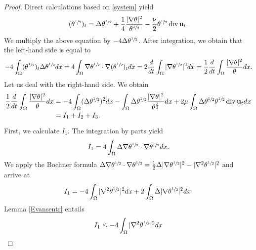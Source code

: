 \documentclass[11pt]{article}
\numberwithin{equation}{section}
\theoremstyle{plain}
\newcommand\bb[1]{\mathbf{#1}}
\newcommand{\io}{\int_{\Omega}}
\newcommand{\ul}{\frac{1}{2}}
\newcommand{\sul}{\sfrac{1}{2}}
\newcommand{\ddt}{\frac{d}{dt}}
\renewcommand{\div}{\operatorname{div}}
\newcommand{\bu}{\bb{u}}
\begin{document}
\begin{proof}
Direct calculations based on \eqref{system} yield
\begin{align*}
(\theta^{\sul})_t=\Delta\theta^{\sul}+\frac14\frac{|\nabla\theta|^2}{\theta^{\sfrac32}}-\frac{\nu}2\theta^{\sul}\div \bu_t.
\end{align*}
We multiply the above equation by $-4\Delta\theta^{\sul}$. After integration, we obtain that the left-hand side is equal to
\begin{align*}
-4\io(\theta^{\sul})_t\Delta\theta^{\sul}dx=4\io\nabla\theta^{\sul}\cdot\nabla(\theta^{\sul})_tdx=2\ddt\io |\nabla\theta^{\sul}|^2dx=\ul\ddt\io\frac{|\nabla\theta|^2}{\theta}dx.
\end{align*}
Let us deal with the right-hand side. We obtain
\begin{align}\label{surow1}
\ul\ddt\io\frac{|\nabla\theta|^2}{\theta}dx&=-4\io(\Delta \theta^{\sul})^2dx-\io\Delta\theta^{\sul}\frac{|\nabla\theta|^2}{\theta^{\frac32}}dx+2\mu\io\Delta\theta^{\sul}\theta^{\sul}\div \bb{u}_tdx \nonumber\\
&= I_1+I_2+I_3.
\end{align}

First, we calculate $I_1$. The integration by parts yield
\begin{align*}
I_1=4\io\Delta \nabla\theta^{\sul}\cdot\nabla\theta^{\sul}dx.
\end{align*}
We apply the Bochner formula $\Delta \nabla\theta^{\sul}\cdot\nabla\theta^{\sul}=\ul\Delta |\nabla\theta^{\sul}|^2-|\nabla^2\theta^{\sul}|^2$ and arrive at
\begin{align*}
I_1=-4\io|\nabla^2\theta^{\sul}|^2dx+2\io\Delta |\nabla\theta^{\sul}|^2dx.
\end{align*}
Lemma \ref{Evansentr} entails
\begin{align}\label{surow2}
I_1\leq -4\io|\nabla^2\theta^{\sul}|^2dx
\end{align}


\end{proof}
\end{document}
